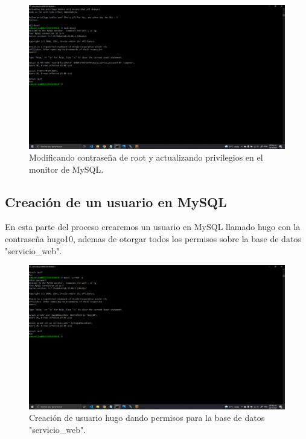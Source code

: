 \documentclass[11pt]{article}
\begin{document}
		\begin{figure}[H]
			\centering
			\includegraphics[scale=0.34]{resources/MYSQLF.png}
			\caption{Modificando contraseña de root y actualizando privilegios en el monitor de MySQL.}\label{fig:picture}
		\end{figure}
		\subsection{Creación de un usuario en MySQL}
		En esta parte del proceso crearemos un usuario en MySQL llamado hugo con la contraseña hugo10, ademas de otorgar todos los permisos sobre la base de datos "servicio\_web".
		\begin{figure}[H]
			\centering
			\includegraphics[scale=0.34]{resources/crearusuariook.png}
			\caption{Creación de usuario hugo dando permisos para la base de datos "servicio\_web".}\label{fig:picture}
		\end{figure}
\end{document}
